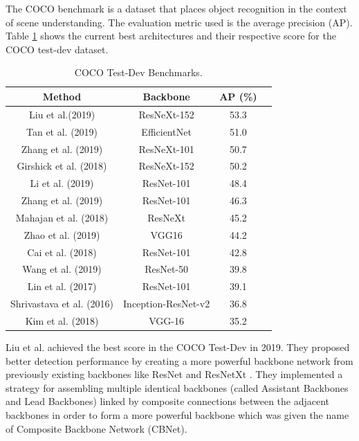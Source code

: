 \par The COCO benchmark \cite{Lin2014} is a dataset that places object recognition in the context of scene understanding. The evaluation metric used is the average precision (AP). Table \ref{table:cocotable} shows the current best architectures and their respective score for the COCO test-dev dataset.

\begin{table}[htb]
    
    \centering
    \caption {COCO Test-Dev Benchmarks.}
    \begin{tabular}{|| c | c | c | c ||} 
    \hline
    Method & Backbone & AP (\%)  \\ [0.5ex] 
    \hline\hline
    Liu et al.(2019) \cite{Liu2019}  & ResNeXt-152 & 53.3 \\ 
    \hline
    Tan et al. (2019) \cite{Tan2019} & EfficientNet & 51.0 \\
    \hline
    Zhang et al. (2019) \cite{Zhang2019} & ResNeXt-101 & 50.7
    \\
    \hline
    Girshick et al. (2018) \cite{Detectron2018} & ResNeXt-152 & 50.2
    \\
    \hline
    Li et al. (2019) \cite{Li2019} & ResNet-101 & 48.4
    \\ [1ex] 
    \hline
    Zhang et al. (2019) \cite{Zhang2019} & ResNet-101  & 46.3
    \\ [1ex]
    \hline
    Mahajan et al. (2018) \cite{Mahajan2018} & ResNeXt & 45.2
    \\ [1ex]
    \hline
    Zhao et al. (2019) \cite{Zhao2019} & VGG16 & 44.2
    \\ [1ex]
    \hline
    Cai et al. (2018) \cite{Cai2018} & ResNet-101 & 42.8
    \\ [1ex]
    \hline
    Wang et al. (2019) \cite{Wang2019} & ResNet-50    & 39.8
    \\ [1ex]
    \hline
    Lin et al. (2017) \cite{Lin2017} & ResNet-101 & 39.1
    \\ [1ex]
    \hline
    Shrivastava et al. (2016) \cite{shrivastava2016skip} & Inception-ResNet-v2 & 36.8
    \\ [1ex]
    \hline
    Kim et al. (2018) \cite{Kim2018} & VGG-16 & 35.2
    \\ [1ex]
    \hline
   \end{tabular}
   \label{table:cocotable}
\end{table}

\par Liu et al. \cite{Liu2019} achieved the best score in the COCO Test-Dev in 2019. They proposed better detection performance by creating a more powerful backbone network from previously existing backbones like ResNet \cite{He2016} and ResNetXt \cite{Xie2017}. They implemented a strategy for assembling multiple identical backbones (called Assistant Backbones and Lead Backbones) linked by composite connections between the adjacent backbones in order to form a more powerful backbone which was given the name of Composite Backbone Network (CBNet).

